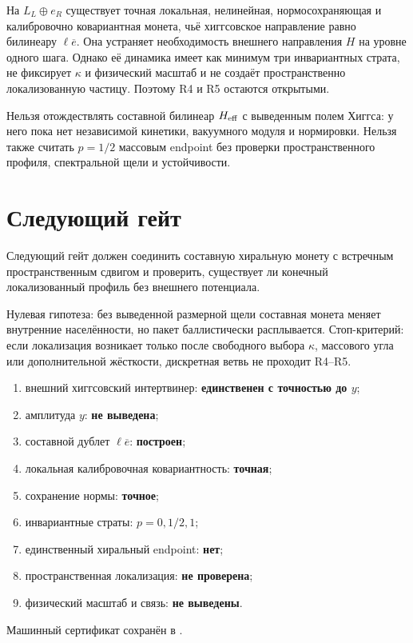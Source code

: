 \begin{theorem}
На $L_L\oplus e_R$ существует точная локальная, нелинейная,
нормосохраняющая и калибровочно ковариантная монета, чьё хиггсовское
направление равно билинеару $\ell\overline e$. Она устраняет необходимость
внешнего направления $H$ на уровне одного шага. Однако её динамика имеет
как минимум три инвариантных страта, не фиксирует $\kappa$ и физический
масштаб и не создаёт пространственно локализованную частицу. Поэтому R4 и
R5 остаются открытыми.
\end{theorem}

\begin{nogocriterion}
Нельзя отождествлять составной билинеар $H_{\rm eff}$ с выведенным полем
Хиггса: у него пока нет независимой кинетики, вакуумного модуля и
нормировки. Нельзя также считать $p=1/2$ массовым endpoint без проверки
пространственного профиля, спектральной щели и устойчивости.
\end{nogocriterion}

\section{Следующий гейт}

Следующий гейт
должен соединить составную хиральную монету с встречным пространственным
сдвигом и проверить, существует ли конечный локализованный профиль без
внешнего потенциала.

Нулевая гипотеза: без выведенной размерной щели составная монета меняет
внутренние населённости, но пакет баллистически расплывается. Стоп-критерий:
если локализация возникает только после свободного выбора $\kappa$,
массового угла или дополнительной жёсткости, дискретная ветвь не проходит
R4--R5.

\begin{protocol}
\begin{enumerate}
 \item внешний хиггсовский интертвинер: \textbf{единственен с точностью до $y$};
 \item амплитуда $y$: \textbf{не выведена};
 \item составной дублет $\ell\overline e$: \textbf{построен};
 \item локальная калибровочная ковариантность: \textbf{точная};
 \item сохранение нормы: \textbf{точное};
 \item инвариантные страты: \textbf{$p=0,1/2,1$};
 \item единственный хиральный endpoint: \textbf{нет};
 \item пространственная локализация: \textbf{не проверена};
 \item физический масштаб и связь: \textbf{не выведены}.
\end{enumerate}
\end{protocol}

Машинный сертификат сохранён в
.